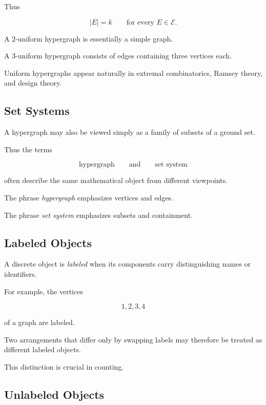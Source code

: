 Thus

\[
\boxed{
|E|=k
\qquad
\text{for every }E\in\mathcal{E}.
}
\]

A \(2\)-uniform hypergraph is essentially a simple graph.

A \(3\)-uniform hypergraph consists of edges containing three vertices
each.

Uniform hypergraphs appear naturally in extremal combinatorics, Ramsey
theory, and design theory.

\subsection{Set Systems}
\label{subsec:set-systems}

A hypergraph may also be viewed simply as a family of subsets of a
ground set.

Thus the terms

\[
\boxed{
\text{hypergraph}
\qquad\text{and}\qquad
\text{set system}
}
\]

often describe the same mathematical object from different viewpoints.

The phrase \emph{hypergraph} emphasizes vertices and edges.

The phrase \emph{set system} emphasizes subsets and containment.

\subsection{Labeled Objects}
\label{subsec:labeled-objects}

A discrete object is \emph{labeled} when its components carry
distinguishing names or identifiers.

For example, the vertices

\[
1,2,3,4
\]

of a graph are labeled.

Two arrangements that differ only by swapping labels may therefore be
treated as different labeled objects.

This distinction is crucial in counting.

\subsection{Unlabeled Objects}
\label{subsec:unlabeled-objects}

